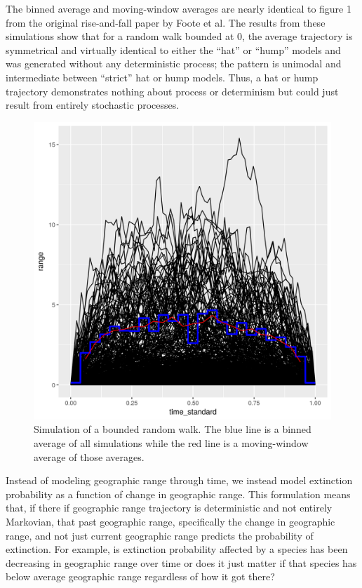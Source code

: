 \documentclass[12pt,letterpaper]{article}
\begin{document}
The binned average and moving-window averages are nearly identical to figure 1 from the original rise-and-fall paper by Foote et al. The results from these simulations show that for a random walk bounded at 0, the average trajectory is symmetrical and virtually identical to either the ``hat'' or ``hump'' models and was generated without any deterministic process; the pattern is unimodal and intermediate between ``strict'' hat or hump models. Thus, a hat or hump trajectory demonstrates nothing about process or determinism but could just result from entirely stochastic processes.

 \begin{figure}[ht]
  \centering
  \includegraphics[width=\textwidth,height=0.5\textheight,keepaspectratio=true]{figure/georange_sim_norm}
  \caption{Simulation of a bounded random walk. The blue line is a binned average of all simulations while the red line is a moving-window average of those averages.}
  \label{fig:range_sim}
\end{figure}

Instead of modeling geographic range through time, we instead model extinction probability as a function of change in geographic range. This formulation means that, if there if geographic range trajectory is deterministic and not entirely Markovian, that past geographic range, specifically the change in geographic range, and not just current geographic range predicts the probability of extinction. For example, is extinction probability affected by a species has been decreasing in geographic range over time or does it just matter if that species has below average geographic range regardless of how it got there?
\end{document}
